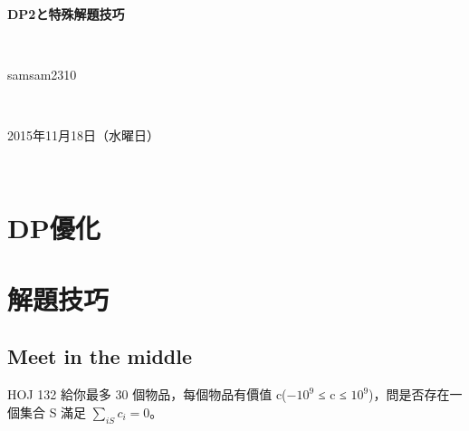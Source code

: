 \documentclass{article}
\title{\hmwkClass}
\author{\hmwkAuthorName}
\date{\hmwkDueDate}
\def\normalsize{\fontsize{12}{16}\selectfont}
\def\large{\fontsize{16}{24}\selectfont}
\def\LARGE{\fontsize{24}{36}\selectfont}
\newcommand{\hmwkDueDate}{2015年11月18日（水曜日）} %
\newcommand{\hmwkClass}{DP2と特殊解題技巧} %
\newcommand{\hmwkAuthorName}{samsam2310} %
\begin{document}
\LARGE~\\[4ex]
\centerline{\bf\hmwkClass}\large\\[2ex]\centerline{\hmwkAuthorName}\\[2ex]\centerline{\hmwkDueDate}\\
\normalsize


\section{DP優化}

\subsection{}


\section{解題技巧}

\subsection{Meet in the middle}
HOJ 132 給你最多 30 個物品，每個物品有價值 c($−10^9$ ≤ c ≤ $10^9$)，問是否存在一個集合 S 滿足 $\sum_{i S}c_i = 0$。



\end{document}
